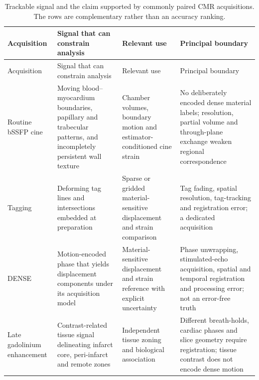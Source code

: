 \begin{longtable}{@{}L{0.18\textwidth}L{0.23\textwidth}L{0.25\textwidth}L{0.25\textwidth}@{}}
\caption{Trackable signal and the claim supported by commonly paired CMR acquisitions. The rows are
complementary rather than an accuracy ranking.}\label{tab:signal}\\
\toprule
Acquisition & Signal that can constrain analysis & Relevant use & Principal boundary\\
\midrule
\endfirsthead
\toprule
Acquisition & Signal that can constrain analysis & Relevant use & Principal boundary\\
\midrule
\endhead
Routine bSSFP cine & Moving blood--myocardium boundaries, papillary and trabecular patterns, and incompletely persistent wall texture & Chamber volumes, boundary motion and estimator-conditioned cine strain & No deliberately encoded dense material labels; resolution, partial volume and through-plane exchange weaken regional correspondence~\citep{pedrizzetti2016,adams2023}\\
Tagging & Deforming tag lines and intersections embedded at preparation & Sparse or gridded material-sensitive displacement and strain comparison & Tag fading, spatial resolution, tag-tracking and registration error; a dedicated acquisition~\citep{cao2018,wehner2018}\\
DENSE & Motion-encoded phase that yields displacement components under its acquisition model & Material-sensitive displacement and strain reference with explicit uncertainty & Phase unwrapping, stimulated-echo acquisition, spatial and temporal registration and processing error; not an error-free truth~\citep{cao2018,wang2023strainnet}\\
Late gadolinium enhancement & Contrast-related tissue signal delineating infarct core, peri-infarct and remote zones & Independent tissue zoning and biological association & Different breath-holds, cardiac phases and slice geometry require registration; tissue contrast does not encode dense motion~\citep{guo2021,almeida2021}\\
\bottomrule
\end{longtable}

